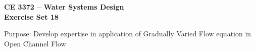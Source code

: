 \documentclass[12pt]{article}
\begin{document}
\begin{center}
{\textbf{{ CE 3372 -- Water Systems Design} \\ {Exercise Set 18}}}
\end{center}

Purpose: Develop expertise in application of Gradually Varied Flow equation in Open Channel Flow\\
\end{document}
